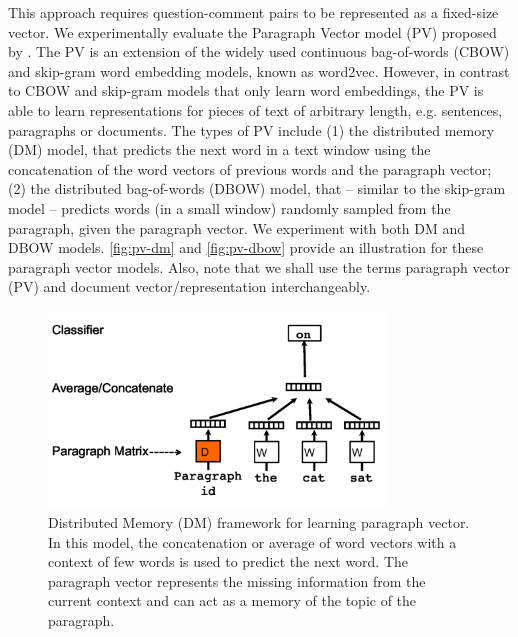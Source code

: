 \documentclass[12pt, a4paper, oneside]{Thesis} %
\begin{document}
This approach requires question-comment pairs to be represented as a fixed-size vector. We experimentally evaluate the Paragraph Vector model (PV) proposed by \cite{le2014distributed}. The PV is an extension of the widely used continuous bag-of-words (CBOW) and skip-gram word embedding models, known as word2vec. However, in contrast to CBOW and skip-gram models that only learn word embeddings, the PV is able to learn representations for pieces of text of arbitrary length, e.g. sentences, paragraphs or documents. The types of PV include (1) the distributed memory (DM) model, that predicts the next word in a text window using the concatenation of the word vectors of previous words and the paragraph vector; (2) the distributed bag-of-words (DBOW) model, that – similar to the skip-gram model – predicts words (in a small window) randomly sampled from the paragraph, given the paragraph vector. We experiment with both DM and DBOW models. \autoref{fig:pv-dm} and \autoref{fig:pv-dbow} provide an illustration for these paragraph vector models. Also, note that we shall use the terms paragraph vector (PV) and document vector/representation interchangeably.

\begin{figure}[t!]
  \centering
  \includegraphics[keepaspectratio, width=0.8\textwidth]{./Pictures/pv-dm.png}
  \caption{Distributed Memory (DM) framework for learning paragraph vector. In this model, the concatenation or average of word vectors with a context of few words is used to predict the next word. The paragraph vector represents the missing information from the current context and can act as a memory of the topic of the paragraph.}
  \label{fig:pv-dm}
\end{figure}
\end{document}
